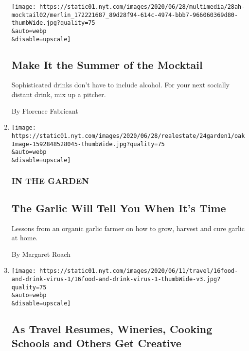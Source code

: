 \begin{enumerate}
  \texttt{[image: https://static01.nyt.com/images/2020/06/28/multimedia/28ah-mocktail02/merlin\_172221687\_89d28f94-614c-4974-bbb7-966060369d80-thumbWide.jpg?quality=75\\\&auto=webp\\\&disable=upscale]}

  \hypertarget{make-it-the-summer-of-the-mocktail}{%
  \subsection{Make It the Summer of the
  Mocktail}\label{make-it-the-summer-of-the-mocktail}}

  Sophisticated drinks don't have to include alcohol. For your next
  socially distant drink, mix up a pitcher.

  By Florence Fabricant
\item
  \href{/2020/06/24/realestate/grow-garlic-garden-organic.html}{}

  \texttt{[image: https://static01.nyt.com/images/2020/06/28/realestate/24garden1/oakImage-1592848528045-thumbWide.jpg?quality=75\\\&auto=webp\\\&disable=upscale]}

  \hypertarget{in-the-garden}{%
  \subsubsection{IN THE GARDEN}\label{in-the-garden}}

  \hypertarget{the-garlic-will-tell-you-when-its-time}{%
  \subsection{The Garlic Will Tell You When It's
  Time}\label{the-garlic-will-tell-you-when-its-time}}

  Lessons from an organic garlic farmer on how to grow, harvest and cure
  garlic at home.

  By Margaret Roach
\item
  \href{/2020/06/16/travel/wineries-distilleries-farm-stay-cooking-schools-virus.html}{}

  \texttt{[image: https://static01.nyt.com/images/2020/06/11/travel/16food-and-drink-virus-1/16food-and-drink-virus-1-thumbWide-v3.jpg?quality=75\\\&auto=webp\\\&disable=upscale]}

  \hypertarget{as-travel-resumes-wineries-cooking-schools-and-others-get-creative}{%
  \subsection{As Travel Resumes, Wineries, Cooking Schools and Others
  Get
  Creative}\label{as-travel-resumes-wineries-cooking-schools-and-others-get-creative}}


\end{enumerate}
